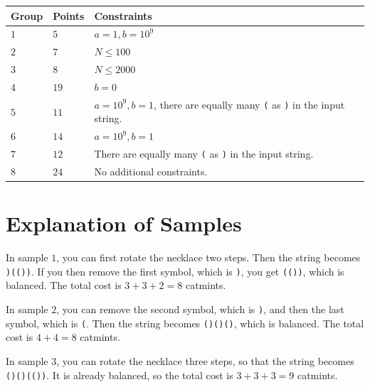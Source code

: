 \noindent
\begin{tabular}{| l | l | p{12cm} |}
  \hline
  \textbf{Group} & \textbf{Points} & \textbf{Constraints} \\ \hline
  $1$    & $5$        & $a = 1, b = 10^9$ \\ \hline
  $2$    & $7$        & $N \le 100$  \\ \hline
  $3$    & $8$        & $N \le 2000$ \\ \hline
  $4$    & $19$       & $b = 0$ \\ \hline
  $5$    & $11$       & $a = 10^9, b = 1$, there are equally many \texttt{(} as \texttt{)} in the input string. \\ \hline
  $6$    & $14$       & $a = 10^9, b = 1$ \\ \hline
  $7$    & $12$       & There are equally many \texttt{(} as \texttt{)} in the input string. \\ \hline
  $8$    & $24$       & No additional constraints. \\ \hline
\end{tabular}

\section*{Explanation of Samples}
In sample $1$, you can first rotate the necklace two steps.
Then the string becomes \texttt{)(())}.
If you then remove the first symbol, which is \texttt{)}, you get \texttt{(())}, which is balanced.
The total cost is $3 + 3 + 2 = 8$ catmints.

In sample $2$, you can remove the second symbol, which is \texttt{)}, and then the last symbol, which is \texttt{(}.
Then the string becomes \texttt{()()()}, which is balanced.
The total cost is $4 + 4 = 8$ catmints.

In sample $3$, you can rotate the necklace three steps, so that the string becomes \texttt{()()(())}.
It is already balanced, so the total cost is $3 + 3 + 3 = 9$ catmints.
